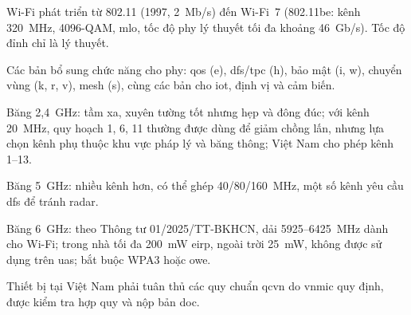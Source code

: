 \begin{tomtat}
\item Wi-Fi phát triển từ 802.11 (1997, 2~Mb/s) đến Wi-Fi~7 (802.11be: kênh 320~MHz, 4096-QAM, \acs{mlo}, tốc độ \acs{phy} lý thuyết tối đa khoảng 46~Gb/s). Tốc độ đỉnh chỉ là lý thuyết.
\item Các bản bổ sung chức năng cho \acs{phy}: \acs{qos} (e), \acs{dfs}/\acs{tpc} (h), bảo mật (i, w), chuyển vùng (k, r, v), mesh (s), cùng các bản cho \acs{iot}, định vị và cảm biến.
\item Băng 2,4~GHz: tầm xa, xuyên tường tốt nhưng hẹp và đông đúc; với kênh
20~MHz, quy hoạch 1, 6, 11 thường được dùng để giảm chồng lấn, nhưng lựa chọn
kênh phụ thuộc khu vực pháp lý và băng thông; Việt Nam cho phép kênh 1--13.
\item Băng 5~GHz: nhiều kênh hơn, có thể ghép 40/80/160~MHz, một số kênh yêu cầu \acs{dfs} để tránh radar.
\item Băng 6~GHz: theo Thông tư 01/2025/TT-BKHCN, dải 5925--6425~MHz dành cho Wi-Fi; trong nhà tối đa 200~mW \acs{eirp}, ngoài trời 25~mW, không được sử dụng trên \acs{uas}; bắt buộc WPA3 hoặc \acs{owe}.
\item Thiết bị tại Việt Nam phải tuân thủ các quy chuẩn \acs{qcvn} do \acs{vnmic} quy định, được kiểm tra hợp quy và nộp bản \acs{doc}.
\end{tomtat}
\endgroup
